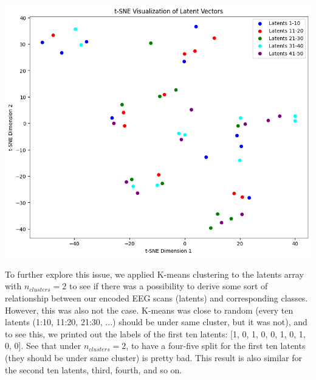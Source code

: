 \documentclass{article}
\begin{document}
\includegraphics[scale=0.5]{cs236c.png}

To further explore this issue, we applied K-means clustering to the latents array with $n_{clusters} = 2$ to see if there was a possibility to derive some sort of relationship between our encoded EEG scans (latents) and corresponding classes. However, this was also not the case. K-means was close to random (every ten latents (1:10, 11:20, 21:30, ...) should be under same cluster, but it was not), and to see this, we printed out the labels of the first ten latents: [1, 0, 1, 0, 0, 1, 0, 1, 0, 0]. See that under $n_{clusters} = 2$, to have a four-five split for the first ten latents (they should be under same cluster) is pretty bad. This result is also similar for the second ten latents, third, fourth, and so on.
\end{document}

